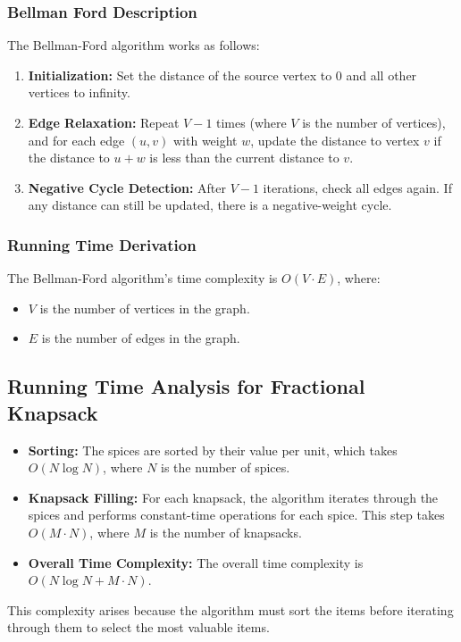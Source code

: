 \documentclass[a4paper,12pt]{article}
\begin{document}
\subsubsection{Bellman Ford Description}
The Bellman-Ford algorithm works as follows:
\begin{enumerate}
    \item \textbf{Initialization:} Set the distance of the source vertex to 0 and all other vertices to infinity.
    \item \textbf{Edge Relaxation:} Repeat $V-1$ times (where $V$ is the number of vertices), and for each edge $(u, v)$ with weight $w$, update the distance to vertex $v$ if the distance to $u + w$ is less than the current distance to $v$.
    \item \textbf{Negative Cycle Detection:} After $V-1$ iterations, check all edges again. If any distance can still be updated, there is a negative-weight cycle.
\end{enumerate}

\subsubsection{Running Time Derivation}
The Bellman-Ford algorithm's time complexity is $O(V \cdot E)$, where:
\begin{itemize}
    \item $V$ is the number of vertices in the graph.
    \item $E$ is the number of edges in the graph.
\end{itemize}


\subsection{Running Time Analysis for Fractional Knapsack}
\begin{itemize}
    \item \textbf{Sorting:} The spices are sorted by their value per unit, which takes $O(N \log N)$, where $N$ is the number of spices.
    \item \textbf{Knapsack Filling:} For each knapsack, the algorithm iterates through the spices and performs constant-time operations for each spice. This step takes $O(M \cdot N)$, where $M$ is the number of knapsacks.
    \item \textbf{Overall Time Complexity:} The overall time complexity is $O(N \log N + M \cdot N)$. 
\end{itemize}

This complexity arises because the algorithm must sort the items before iterating through them to select the most valuable items.
\end{document}

